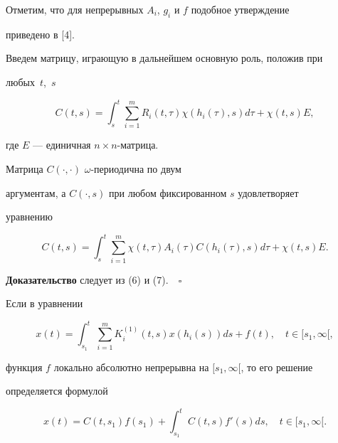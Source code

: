 Отметим, что для непрерывных $A_i$,  $g_i$ и $f$ подобное утверждение


приведено в [4].





Введем матрицу, играющую в дальнейшем основную роль, положив при


любых~$t$,~$s$


\begin{equation}


C(t,s)=\int_s^t\sum_{i=1}^m R_i(t,\tau)


\chi(h_i(\tau),s)d\tau+\chi(t,s)E,


\end{equation}


где $E$ --- единичная $n\times n$-матрица.





\begin{thm}


Матрица $C(\cdot,\cdot)$ $\omega$-периодична по двум


аргументам, а $C(\cdot, s)$ при любом фиксированном $s$ удовлетворяет


уравнению


\begin{equation}


C(t,s)=\int_s^t\sum_{i=1}^m \chi(t,\tau)A_i(\tau)C(h_i(\tau),s)d\tau


+\chi(t,s)E.


\end{equation}


\end{thm}





{\bf Доказательство}  следует из (6) и (7).$\quad \square$





\begin{thm}


Если в уравнении


$$


x(t)=\int_{s_1}^t\sum_{i=1}^m K^{(1)}_i(t,s)x(h_i(s))ds+f(t),


\quad t\in [s_1,\infty[,


$$


функция $f$ локально абсолютно непрерывна на $[s_1,\infty[$, то его решение


определяется формулой


\begin{equation}


x(t)=C(t,s_1)f(s_1)+\int_{s_1}^tC(t,s)f'(s)ds,\quad t\in [s_1,\infty[.


\end{equation}


\end{thm}





